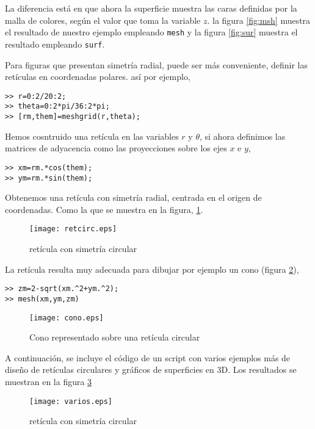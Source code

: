 La diferencia está en que ahora la superficie muestra las caras definidas por la malla de colores, según el valor que toma la variable $z$. la figura \ref{fig:msh} muestra el resultado de nuestro ejemplo empleando \texttt{mesh} y la figura \ref{fig:sur} muestra el resultado empleando \texttt{surf}.



Para figuras que presentan simetría radial, puede ser más conveniente, definir las retículas en coordenadas polares. así por ejemplo,

\begin{verbatim}
>> r=0:2/20:2;
>> theta=0:2*pi/36:2*pi;
>> [rm,them]=meshgrid(r,theta);
\end{verbatim}

Hemos cosntruido una retícula en las variables $r$ y $\theta$, si ahora definimos las matrices de adyacencia como las proyecciones sobre los ejes $x$ e $y$,

\begin{verbatim}
>> xm=rm.*cos(them);
>> ym=rm.*sin(them); 
\end{verbatim}

Obtenemos una retícula con simetría radial, centrada en el origen de coordenadas. Como la que se muestra en la figura, \ref{fig:retcir}.

\begin{figure}[h]
\centering
\texttt{[image: retcirc.eps]}
\caption{retícula con simetría circular}
\label{fig:retcir}
\end{figure}

La retícula resulta muy adecuada para dibujar por ejemplo un cono (figura \ref{fig:cono}),

\begin{verbatim}
>> zm=2-sqrt(xm.^2+ym.^2);
>> mesh(xm,ym,zm)
\end{verbatim}

\begin{figure}[h]
\centering
\texttt{[image: cono.eps]}
\caption{Cono representado sobre una retícula circular}
\label{fig:cono}
\end{figure}

A continuación, se incluye el código de un script con varios ejemplos más de diseño de retículas circulares y gráficos de superficies en 3D. Los resultados se muestran en la figura \ref{fig:varios}

%

\begin{figure}[h]
\centering
\texttt{[image: varios.eps]}
\caption{retícula con simetría circular}
\label{fig:varios}
\end{figure}

